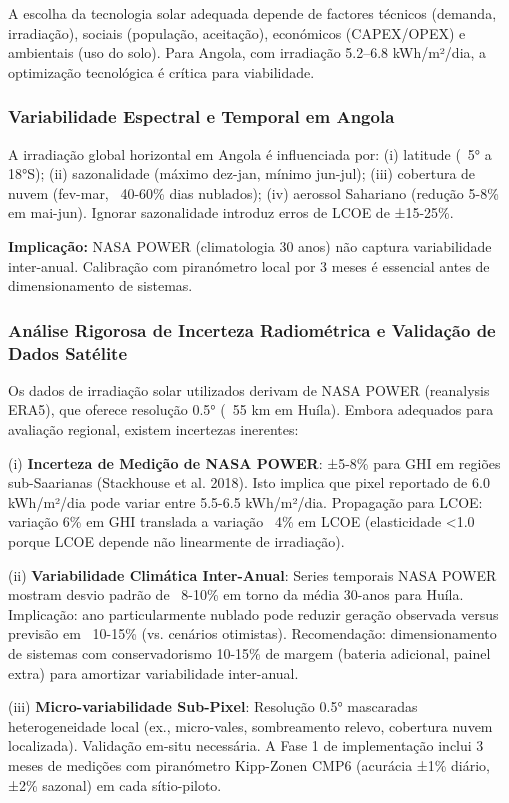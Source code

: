\documentclass[12pt, a4paper]{article}
\begin{document}
A escolha da tecnologia solar adequada depende de factores técnicos (demanda, irradiação), sociais (população, aceitação), económicos (CAPEX/OPEX) e ambientais (uso do solo). Para Angola, com irradiação 5.2--6.8 kWh/m²/dia, a optimização tecnológica é crítica para viabilidade.

\subsubsection{Variabilidade Espectral e Temporal em Angola}

A irradiação global horizontal em Angola é influenciada por: (i) latitude (~5° a 18°S); (ii) sazonalidade (máximo dez-jan, mínimo jun-jul); (iii) cobertura de nuvem (fev-mar, ~40-60\% dias nublados); (iv) aerossol Sahariano (redução 5-8\% em mai-jun). Ignorar sazonalidade introduz erros de LCOE de ±15-25\%.

\textbf{Implicação:} NASA POWER (climatologia 30 anos) não captura variabilidade inter-anual. Calibração com piranómetro local por 3 meses é essencial antes de dimensionamento de sistemas.

\subsubsection{Análise Rigorosa de Incerteza Radiométrica e Validação de Dados Satélite}

Os dados de irradiação solar utilizados derivam de NASA POWER (reanalysis ERA5), que oferece resolução 0.5° (~55 km em Huíla). Embora adequados para avaliação regional, existem incertezas inerentes:

(i) \textbf{Incerteza de Medição de NASA POWER}: ±5-8\% para GHI em regiões sub-Saarianas (Stackhouse et al. 2018). Isto implica que pixel reportado de 6.0 kWh/m²/dia pode variar entre 5.5-6.5 kWh/m²/dia. Propagação para LCOE: variação 6\% em GHI translada a variação ~4\% em LCOE (elasticidade <1.0 porque LCOE depende não linearmente de irradiação).

(ii) \textbf{Variabilidade Climática Inter-Anual}: Series temporais NASA POWER mostram desvio padrão de ~8-10\% em torno da média 30-anos para Huíla. Implicação: ano particularmente nublado pode reduzir geração observada versus previsão em ~10-15\% (vs. cenários otimistas). Recomendação: dimensionamento de sistemas com conservadorismo 10-15\% de margem (bateria adicional, painel extra) para amortizar variabilidade inter-anual.

(iii) \textbf{Micro-variabilidade Sub-Pixel}: Resolução 0.5° mascaradas heterogeneidade local (ex., micro-vales, sombreamento relevo, cobertura nuvem localizada). Validação em-situ necessária. A Fase 1 de implementação inclui 3 meses de medições com piranómetro Kipp-Zonen CMP6 (acurácia ±1\% diário, ±2\% sazonal) em cada sítio-piloto.
\end{document}
